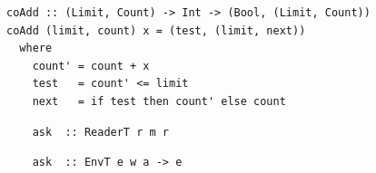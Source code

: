 \documentclass{beamer}
\begin{document}

\begin{frame}[fragile]
  \begin{verbatim}
coAdd :: (Limit, Count) -> Int -> (Bool, (Limit, Count))
coAdd (limit, count) x = (test, (limit, next))
  where
    count' = count + x
    test   = count' <= limit
    next   = if test then count' else count
  \end{verbatim}
\end{frame}

\begin{frame}[fragile]
  \begin{overprint}
  \begin{verbatim}
    ask  :: ReaderT r m r
  \end{verbatim}
  \begin{verbatim}
    ask  :: EnvT e w a -> e
  \end{verbatim}
  \end{overprint}
\end{frame}
\end{document}

